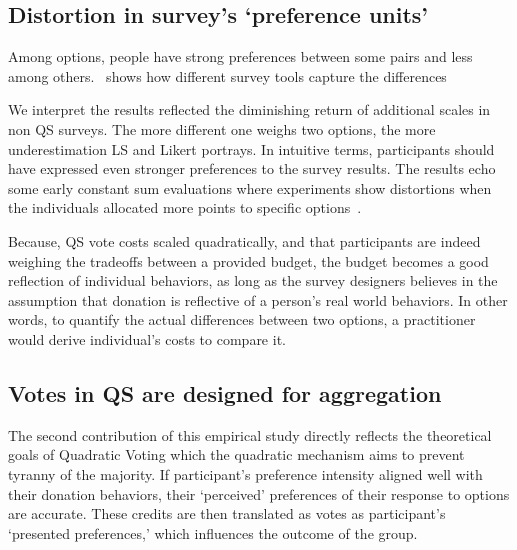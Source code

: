 \subsection{Distortion in survey's `preference units'}
Among options, people have strong preferences between some pairs and less among others.~ shows how different survey tools capture the differences 



We interpret the results reflected the diminishing return of additional scales in non QS surveys. The more different one weighs two options, the more underestimation LS and Likert portrays. In intuitive terms, participants should have expressed even stronger preferences to the survey results. The results echo some early constant sum evaluations where experiments show distortions when the individuals allocated more points to specific options~\cite{}.

Because, QS vote costs scaled quadratically, and that participants are indeed weighing the tradeoffs between a provided budget, the budget becomes a good reflection of individual behaviors, as long as the survey designers believes in the assumption that donation is reflective of a person's real world behaviors. In other words, to quantify the actual differences between two options, a practitioner would derive individual's costs to compare it.

\subsection{Votes in QS are designed for aggregation}
The second contribution of this empirical study directly reflects the theoretical goals of Quadratic Voting which the quadratic mechanism aims to prevent tyranny of the majority. If participant's preference intensity aligned well with their donation behaviors, their `perceived' preferences of their response to options are accurate. These credits are then translated as votes as participant's `presented preferences,' which influences the outcome of the group.






